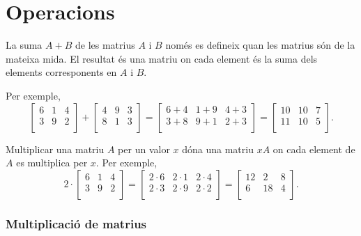 \section{Operacions}

La suma $A+B$ de les matrius $A$ i $B$ només es defineix quan les
matrius són de la mateixa mida. El resultat és una matriu on cada
element és la suma dels elements corresponents en $A$ i $B$.

Per exemple,
\[
 \begin{bmatrix}
  6 & 1 & 4 \\
  3 & 9 & 2 \\
 \end{bmatrix}
+
 \begin{bmatrix}
  4 & 9 & 3 \\
  8 & 1 & 3 \\
 \end{bmatrix}
=
 \begin{bmatrix}
  6+4 & 1+9 & 4+3 \\
  3+8 & 9+1 & 2+3 \\
 \end{bmatrix}
=
 \begin{bmatrix}
  10 & 10 & 7 \\
  11 & 10 & 5 \\
 \end{bmatrix}.
\]


Multiplicar una matriu $A$ per un valor $x$ dóna una matriu $xA$ on
cada element de $A$ es multiplica per $x$. Per exemple,
\[
 2 \cdot \begin{bmatrix}
  6 & 1 & 4 \\
  3 & 9 & 2 \\
 \end{bmatrix}
=
 \begin{bmatrix}
  2 \cdot 6 & 2\cdot1 & 2\cdot4 \\
  2\cdot3 & 2\cdot9 & 2\cdot2 \\
 \end{bmatrix}
=
 \begin{bmatrix}
  12 & 2 & 8 \\
  6 & 18 & 4 \\
 \end{bmatrix}.
\]


\subsubsection{Multiplicació de matrius}


